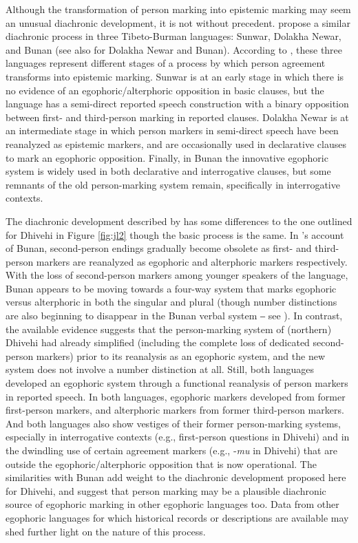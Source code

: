 \documentclass[output=paper]{langsci/langscibook}
\begin{document}
Although the transformation of person marking into epistemic marking may seem an unusual diachronic development, it is not without precedent. \cite{WidmerZemp2017} propose a similar diachronic process in three Tibeto-Burman languages: Sunwar, Dolakha Newar, and Bunan (see also \citealt{Widmer2015} for Dolakha Newar and Bunan). According to \citeauthor{WidmerZemp2017}, these three languages represent different stages of a process by which person agreement transforms into epistemic marking. Sunwar is at an early stage in which there is no evidence of an egophoric/alterphoric opposition in basic clauses, but the language has a semi-direct reported speech construction with a binary opposition between first- and third-person marking in reported clauses. Dolakha Newar is at an intermediate stage in which person markers in semi-direct speech have been reanalyzed as epistemic markers, and are occasionally used in declarative clauses to mark an egophoric opposition. Finally, in Bunan the innovative egophoric system is widely used in both declarative and interrogative clauses, but some remnants of the old person-marking system remain, specifically in interrogative contexts. 

The diachronic development described by \citeauthor{WidmerZemp2017} has some differences to the one outlined for Dhivehi in Figure \ref{fig:jl2} though the basic process is the same. In \citeauthor{WidmerZemp2017}’s account of Bunan, second-person endings gradually become obsolete as first- and third-person markers are reanalyzed as egophoric and alterphoric markers respectively. With the loss of second-person markers among younger speakers of the language, Bunan appears to be moving towards a four-way system that marks egophoric versus alterphoric in both the singular and plural (though number distinctions are also beginning to disappear in the Bunan verbal system ‒ see \citealt[575–576]{Widmer2014}). In contrast, the available evidence suggests that the person-marking system of (northern) Dhivehi had already simplified (including the complete loss of dedicated second-person markers) prior to its reanalysis as an egophoric system, and the new system does not involve a number distinction at all. Still, both languages developed an egophoric system through a functional reanalysis of person markers in reported speech. In both languages, egophoric markers developed from former first-person markers, and alterphoric markers from former third-person markers. And both languages also show vestiges of their former person-marking systems, especially in interrogative contexts (e.g., first-person questions in Dhivehi) and in the dwindling use of certain agreement markers (e.g., ‑\textit{mu} in Dhivehi) that are outside the egophoric/alterphoric opposition that is now operational. The similarities with Bunan add weight to the diachronic development proposed here for Dhivehi, and suggest that person marking may be a plausible diachronic source of egophoric marking in other egophoric languages too. Data from other egophoric languages for which historical records or descriptions are available may shed further light on the nature of this process.
\end{document}
